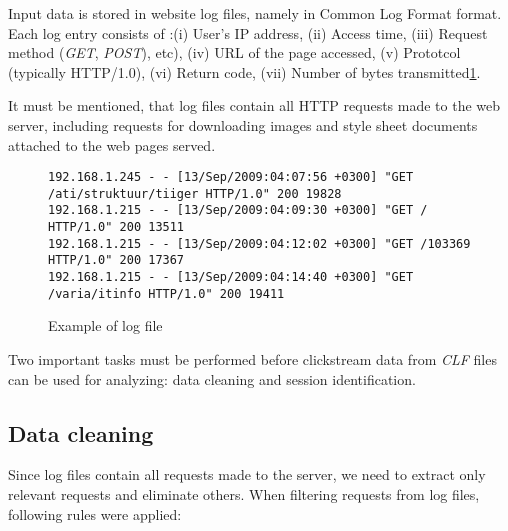 \documentclass[english,a4paper]{article}
\begin{document}
Input data is stored in website log files, namely in Common Log Format\cite{ref_clf} format. Each log entry consists of :(i) User's IP address, (ii) Access time, (iii) Request method (\emph{GET}, \emph{POST}), etc), (iv) URL of the page accessed, (v) Prototcol (typically HTTP/1.0), (vi) Return code, (vii) Number of bytes transmitted\ref{log_sample}.

It must be mentioned, that log files contain all HTTP requests made to the web server, including requests for downloading images and style sheet documents attached to the web pages served.

\begin{figure}[h]
{\tiny
\begin{verbatim}
192.168.1.245 - - [13/Sep/2009:04:07:56 +0300] "GET /ati/struktuur/tiiger HTTP/1.0" 200 19828
192.168.1.215 - - [13/Sep/2009:04:09:30 +0300] "GET / HTTP/1.0" 200 13511
192.168.1.215 - - [13/Sep/2009:04:12:02 +0300] "GET /103369 HTTP/1.0" 200 17367
192.168.1.215 - - [13/Sep/2009:04:14:40 +0300] "GET /varia/itinfo HTTP/1.0" 200 19411
\end{verbatim}
}
\label{log_sample}
\caption{Example of log file}
\end{figure}

Two important tasks must be performed before clickstream data from \emph{CLF} files can be used for analyzing: data cleaning and session identification.









\subsection{Data cleaning}
Since log files contain all requests made to the server, we need to extract only relevant requests and eliminate others. When filtering requests from log files, following rules were applied:
\end{document}
